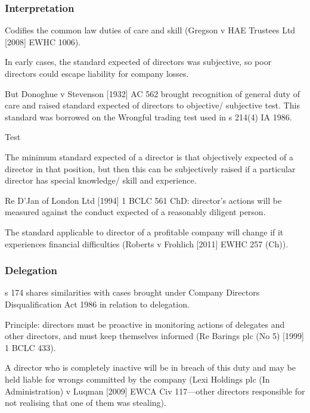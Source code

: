 \documentclass[
]{article}
\newenvironment{env-d7dfd3c8-6d94-4eed-a91e-ca5b45830c05}
{
    \savenotes\tcolorbox[blanker,breakable,left=5pt,borderline west={2pt}{-4pt}{pink}]
}
{
    \endtcolorbox\spewnotes
}
\begin{document}
\hypertarget{interpretation-1}{%
\subsubsection{Interpretation}\label{interpretation-1}}

Codifies the common law duties of care and skill (Gregson v HAE Trustees
Ltd {[}2008{]} EWHC 1006).

In early cases, the standard expected of directors was subjective, so
poor directors could escape liability for company losses.

But Donoghue v Stevenson {[}1932{]} AC 562 brought recognition of
general duty of care and raised standard expected of directors to
objective/ subjective test. This standard was borrowed on the Wrongful
trading test used in s 214(4) IA 1986.

\begin{env-d7dfd3c8-6d94-4eed-a91e-ca5b45830c05}

Test

The minimum standard expected of a director is that objectively expected
of a director in that position, but then this can be subjectively raised
if a particular director has special knowledge/ skill and experience.

\end{env-d7dfd3c8-6d94-4eed-a91e-ca5b45830c05}

Re D'Jan of London Ltd {[}1994{]} 1 BCLC 561 ChD: director's actions
will be measured against the conduct expected of a reasonably diligent
person.

The standard applicable to director of a profitable company will change
if it experiences financial difficulties (Roberts v Frohlich {[}2011{]}
EWHC 257 (Ch)).

\hypertarget{delegation}{%
\subsubsection{Delegation}\label{delegation}}

s 174 shares similarities with cases brought under Company Directors
Disqualification Act 1986 in relation to delegation.

Principle: directors must be proactive in monitoring actions of
delegates and other directors, and must keep themselves informed (Re
Barings plc (No 5) {[}1999{]} 1 BCLC 433).

A director who is completely inactive will be in breach of this duty and
may be held liable for wrongs committed by the company (Lexi Holdings
plc (In Administration) v Luqman {[}2009{]} EWCA Civ 117---other
directors responsible for not realising that one of them was stealing).
\end{document}
